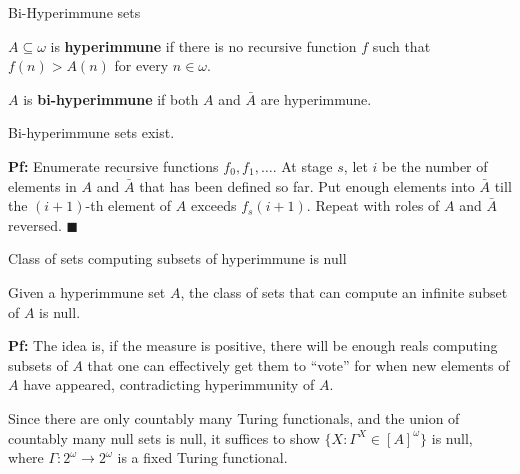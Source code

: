 \begin{frame}{Bi-Hyperimmune sets}
  \begin{define}[Hyperimmune]
    $A\subseteq\omega$ is \textbf{hyperimmune} if there is no recursive
    function $f$ such that $f(n)>A(n)$ for every $n\in\omega$.
  \end{define}

  \begin{define}[Bi-hyperimmune]
    $A$ is \textbf{bi-hyperimmune} if both $A$ and $\bar{A}$ are hyperimmune.
  \end{define}

  \begin{thm}
    Bi-hyperimmune sets exist.
  \end{thm}

  \vspace{0.5em}
  \textbf{Pf:} Enumerate recursive functions $f_0,f_1,\ldots$. At stage
  $s$, let $i$ be the number of elements in $A$ and $\bar{A}$ that has been
  defined so far. Put enough elements into $\bar{A}$ till the $(i+1)$-th
  element of $A$ exceeds $f_s(i+1)$. Repeat with roles of $A$ and $\bar{A}$
  reversed. $\blacksquare$
\end{frame}

\begin{frame}{Class of sets computing subsets of hyperimmune is null}
  \begin{thm}
    \label{thm:bihyper-null}
    Given a hyperimmune set $A$, the class of sets that can compute an
    infinite subset of $A$ is null.
  \end{thm}

  \vspace{1em}
  \textbf{Pf:} The idea is, if the measure is positive, there will be
  enough reals computing subsets of $A$ that one can effectively get them
  to ``vote'' for when new elements of $A$ have appeared, contradicting
  hyperimmunity of $A$.

  \vspace{1em}
  Since there are only countably many Turing functionals, and the union of
  countably many null sets is null, it suffices to show $\{X:
  \Gamma^X\in[A]^\omega\}$ is null, where
  $\Gamma:2^\omega\rightarrow2^\omega$ is a fixed Turing functional.
\end{frame}


